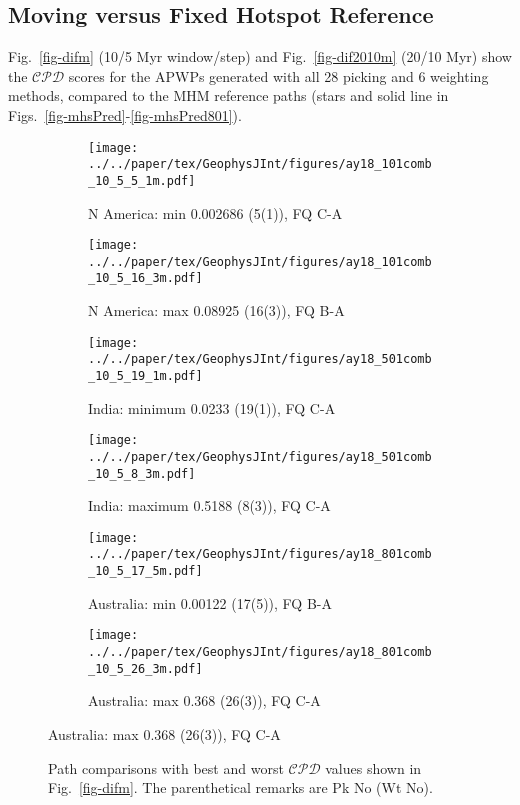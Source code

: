 \subsection{Moving versus Fixed Hotspot Reference}

Fig.~\ref{fig-difm} (10/5 Myr window/step) and Fig.~\ref{fig-dif2010m} (20/10
Myr) show the $\mathcal{CPD}$ scores for the APWPs generated with all 28 picking
and 6 weighting methods, compared to the MHM reference paths (stars and solid
line in Figs.~\ref{fig-mhsPred}-\ref{fig-mhsPred801}).

\begin{figure}[tbp]
  \centering
  \begin{subfigure}{.42\textwidth}
    \texttt{[image: ../../paper/tex/GeophysJInt/figures/ay18\_101comb\_10\_5\_5\_1m.pdf]}
    \caption{N America: min 0.002686 (5(1)), FQ C-A}
  \end{subfigure}
  \begin{subfigure}{.43\textwidth}
    \texttt{[image: ../../paper/tex/GeophysJInt/figures/ay18\_101comb\_10\_5\_16\_3m.pdf]}
    \caption{N America: max 0.08925 (16(3)), FQ B-A}
  \end{subfigure}
  \vspace{.1em}
  \begin{subfigure}{.42\textwidth}
    \texttt{[image: ../../paper/tex/GeophysJInt/figures/ay18\_501comb\_10\_5\_19\_1m.pdf]}
    \caption{India: minimum 0.0233 (19(1)), FQ C-A}
  \end{subfigure}
  \begin{subfigure}{.42\textwidth}
    \texttt{[image: ../../paper/tex/GeophysJInt/figures/ay18\_501comb\_10\_5\_8\_3m.pdf]}
    \caption{India: maximum 0.5188 (8(3)), FQ C-A}
  \end{subfigure}
  \vspace{.1em}
  \begin{subfigure}{.42\textwidth}
    \texttt{[image: ../../paper/tex/GeophysJInt/figures/ay18\_801comb\_10\_5\_17\_5m.pdf]}
    \caption{Australia: min 0.00122 (17(5)), FQ B-A}
  \end{subfigure}
  \begin{subfigure}{.42\textwidth}
    \texttt{[image: ../../paper/tex/GeophysJInt/figures/ay18\_801comb\_10\_5\_26\_3m.pdf]}
    \caption{Australia: max 0.368 (26(3)), FQ C-A}
  \end{subfigure}
\end{figure}
\begin{figure}[!ht]
  \ContinuedFloat\caption[Best and worst $\mathcal{CPD}$s (10/5 Myr window/step; MHM)]{Path
    comparisons with best and worst $\mathcal{CPD}$ values shown in
    Fig.~\ref{fig-difm}. The parenthetical remarks are Pk No (Wt
    No).}\label{fig-difbwm}
\end{figure}

